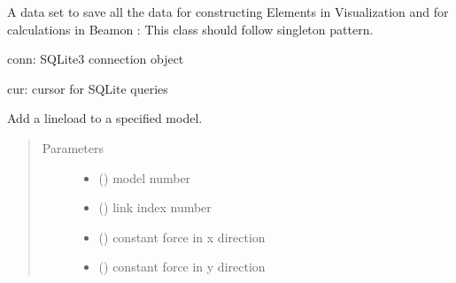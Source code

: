 \documentclass[letterpaper,10pt,english]{sphinxmanual}
\begin{document}
\begin{fulllineitems}
\label{\detokenize{api:beamon.database.database.Database}}
A data set to save all the data for constructing Elements in Visualization and for calculations in Beamon
: This class should follow singleton pattern.

conn: SQLite3 connection object

cur: cursor for SQLite queries

\begin{fulllineitems}
\label{\detokenize{api:beamon.database.database.Database.add_lineload}}
Add a lineload to a specified model.
\begin{quote}\begin{description}
\item[{Parameters}] \leavevmode\begin{itemize}
\item {} 
 () \textendash{} model number

\item {} 
 () \textendash{} link index number

\item {} 
 () \textendash{} constant force in x direction

\item {} 
 () \textendash{} constant force in y direction


\end{itemize}
\end{description}
\end{quote}
\end{fulllineitems}
\end{fulllineitems}
\end{document}
